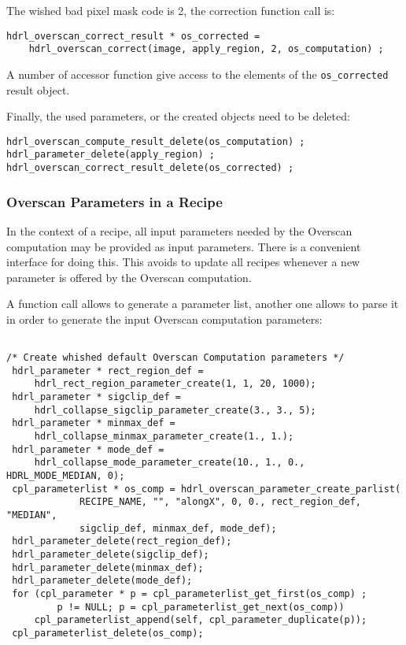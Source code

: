 The wished bad pixel mask code is 2, the correction function call is:
\begin{lstlisting}
hdrl_overscan_correct_result * os_corrected = 
    hdrl_overscan_correct(image, apply_region, 2, os_computation) ;
\end{lstlisting}

A number of accessor function give access to the elements of the
\verb+os_corrected+ result object.

Finally, the used parameters, or the created objects need to be deleted:
\begin{lstlisting}
hdrl_overscan_compute_result_delete(os_computation) ;
hdrl_parameter_delete(apply_region) ;
hdrl_overscan_correct_result_delete(os_corrected) ;
\end{lstlisting}

\subsubsection{Overscan Parameters in a Recipe} 
\label{sec:algorithms:overscan:parameters}

In the context of a recipe, all input parameters needed by the Overscan 
computation may be provided as input parameters. There is a convenient
interface for doing this. This avoids to update all recipes whenever a
new parameter is offered by the Overscan computation.

A function call allows to generate a parameter list, another one allows
to parse it in order to generate the input Overscan computation
parameters:

\begin{lstlisting}

/* Create whished default Overscan Computation parameters */
 hdrl_parameter * rect_region_def =
     hdrl_rect_region_parameter_create(1, 1, 20, 1000);
 hdrl_parameter * sigclip_def =
     hdrl_collapse_sigclip_parameter_create(3., 3., 5);
 hdrl_parameter * minmax_def =
     hdrl_collapse_minmax_parameter_create(1., 1.);
 hdrl_parameter * mode_def =
     hdrl_collapse_mode_parameter_create(10., 1., 0., HDRL_MODE_MEDIAN, 0);
 cpl_parameterlist * os_comp = hdrl_overscan_parameter_create_parlist(
             RECIPE_NAME, "", "alongX", 0, 0., rect_region_def, "MEDIAN",
             sigclip_def, minmax_def, mode_def);
 hdrl_parameter_delete(rect_region_def);
 hdrl_parameter_delete(sigclip_def);
 hdrl_parameter_delete(minmax_def);
 hdrl_parameter_delete(mode_def);
 for (cpl_parameter * p = cpl_parameterlist_get_first(os_comp) ; 
         p != NULL; p = cpl_parameterlist_get_next(os_comp)) 
     cpl_parameterlist_append(self, cpl_parameter_duplicate(p));
 cpl_parameterlist_delete(os_comp);

\end{lstlisting}

